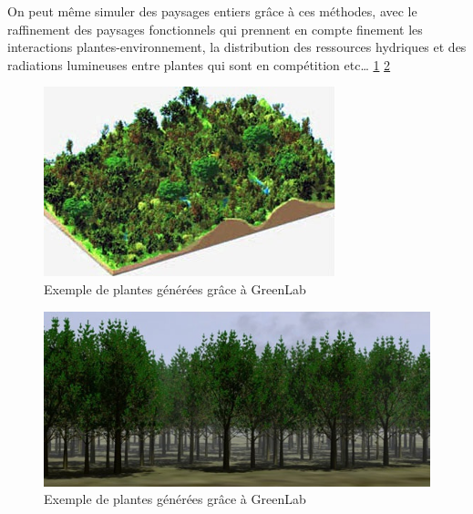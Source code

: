 On peut même simuler des paysages entiers grâce à ces méthodes, avec le raffinement des paysages fonctionnels qui prennent en compte finement les interactions plantes-environnement, la distribution des ressources hydriques et des radiations lumineuses entre plantes qui sont en compétition etc… \ref{fig:exempleP1} \ref{fig:exempleP2}

\begin{figure}[h]
	\begin{center}
	
	
  \includegraphics[scale=1.0]{./img/exempleP1.jpg}
  \caption{Exemple de plantes générées grâce à GreenLab}
  \label{fig:exempleP1}
  
  \end{center}
\end{figure}

\begin{figure}[h]
	\begin{center}
	
	
  \includegraphics[scale=1.0]{./img/exempleP2.jpg}
  \caption{Exemple de plantes générées grâce à GreenLab}
  \label{fig:exempleP2}
  
  \end{center}
\end{figure}



